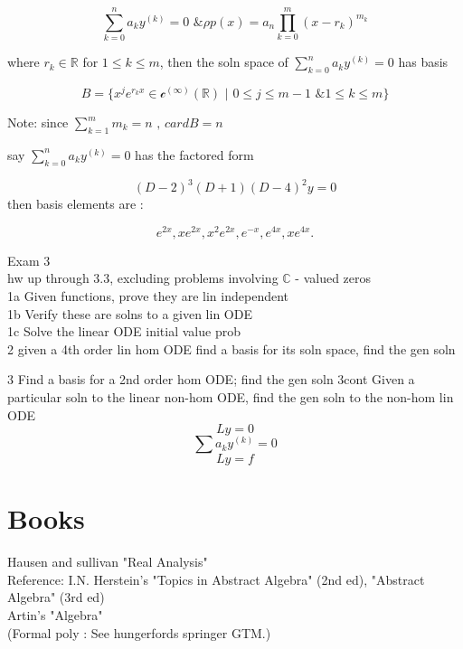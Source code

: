 \[ \sum_{k=0}^{n}a_ky^{(k)} = 0 \text{ \& } \rho p(x) = a_n
\prod_{k=0}^m (x-r_k)^{m_k} \]

where \( r_k \in \mathbb{R} \) for \( 1 \leq k \leq m \), then the soln
space of \( \sum_{k=0}^{n} a_k y^{(k)} = 0 \) has basis 

\[ B = \{ x^j e^{r_kx} \in \mathscr{c}^{(\infty)} ( \mathbb{R})
\text{ | } 0 \leq j \leq m-1 \text{ \& } 1  \leq k \leq m \}\]

Note: since \( \sum_{k=1}^{m} m_k = n \text{ , } cardB=n \)

\begin{example}
  say \( \sum_{k=0}^{n}a_ky^{(k)} = 0 \) has the factored form 

  \[ (D-2)^3(D+1)(D-4)^2y= 0 \]
  then basis elements are : 

  \[ e^{2x}, xe^{2x}, x^2e^{2x}, e^{-x}, e^{4x}, xe^{4x}. \]

\end{example}

Exam 3\\ 
hw up through 3.3, excluding problems involving  \( \mathbb{C}  \) -
valued zeros \\

1a Given functions, prove they are lin independent\\ 
1b Verify these are solns to a given lin ODE \\ 
1c Solve the linear ODE  initial value prob \\

2 given a 4th order lin hom ODE find a basis for its soln space, find the
gen soln

3 Find a basis for a 2nd order hom ODE; find the gen soln 
3cont Given a particular soln to the linear non-hom ODE, find the gen
soln to the non-hom  lin ODE 
\[ Ly = 0  \]
\[ \sum a_k y^{(k)} = 0 \]
\[ Ly = f \]

\newpage
\section*{Books}
  Hausen and sullivan "Real Analysis" \\
  Reference: I.N. Herstein's "Topics in Abstract Algebra" (2nd ed),
  "Abstract Algebra" (3rd ed)\\
  Artin's "Algebra" \\
  (Formal poly : See hungerfords springer GTM.) \\









